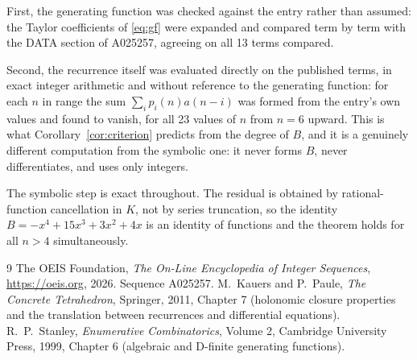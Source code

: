\documentclass[11pt,a4paper]{article}
\theoremstyle{plain}
\theoremstyle{definition}
\begin{document}
First, the generating function was checked against the entry rather than assumed: the
Taylor coefficients of \eqref{eq:gf} were expanded and compared term by term with the DATA
section of A025257, agreeing on all 13 terms compared.

Second, the recurrence itself was evaluated directly on the published terms, in exact
integer arithmetic and without reference to the generating function: for each $n$ in range
the sum $\sum_{i}p_{i}(n)a(n-i)$ was formed from the entry's own values and found to
vanish, for all 23 values of $n$ from $n=6$ upward. This is what
Corollary~\ref{cor:criterion} predicts from the degree of $B$, and it is a genuinely
different computation from the symbolic one: it never forms $B$, never differentiates, and
uses only integers.

The symbolic step is exact throughout. The residual is obtained by rational-function
cancellation in $K$, not by series truncation, so the identity $B=- x^{4} + 15 x^{3} + 3 x^{2} + 4 x$ is an
identity of functions and the theorem holds for all $n>4$ simultaneously.

\begin{thebibliography}{9}
 The OEIS Foundation, \emph{The On-Line Encyclopedia of Integer Sequences},
\url{https://oeis.org}, 2026. Sequence A025257.
 M.~Kauers and P.~Paule, \emph{The Concrete Tetrahedron}, Springer, 2011,
Chapter 7 (holonomic closure properties and the translation between recurrences and
differential equations).
 R.~P.~Stanley, \emph{Enumerative Combinatorics}, Volume 2, Cambridge
University Press, 1999, Chapter 6 (algebraic and D-finite generating functions).
\end{thebibliography}
\end{document}
